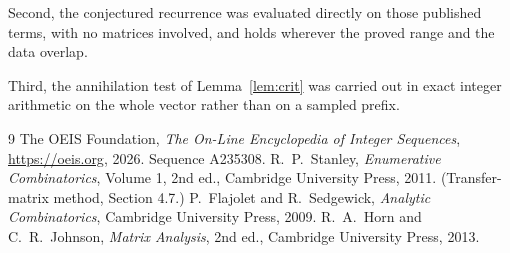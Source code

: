 \documentclass[11pt,a4paper]{article}
\theoremstyle{plain}
\theoremstyle{definition}
\begin{document}
Second, the conjectured recurrence was evaluated directly on those published terms, with no
matrices involved, and holds wherever the proved range and the data overlap.

Third, the annihilation test of Lemma~\ref{lem:crit} was carried out in exact integer
arithmetic on the whole vector rather than on a sampled prefix.

\begin{thebibliography}{9}
 The OEIS Foundation, \emph{The On-Line Encyclopedia of Integer
Sequences}, \url{https://oeis.org}, 2026. Sequence A235308.
 R.~P.~Stanley, \emph{Enumerative Combinatorics}, Volume 1, 2nd ed.,
Cambridge University Press, 2011. (Transfer-matrix method, Section 4.7.)
 P.~Flajolet and R.~Sedgewick, \emph{Analytic Combinatorics}, Cambridge
University Press, 2009.
 R.~A.~Horn and C.~R.~Johnson, \emph{Matrix Analysis}, 2nd ed., Cambridge
University Press, 2013.
\end{thebibliography}
\end{document}
